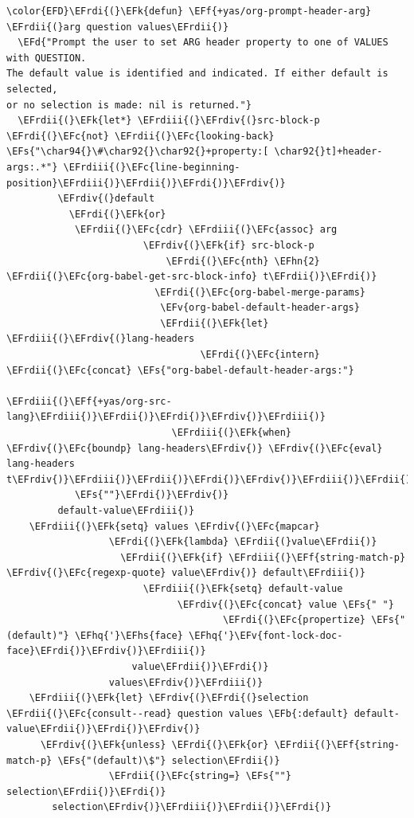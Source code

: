 \documentclass{scrartcl}
\newcommand{\EFk}[1]{\textcolor{EFk}{#1}} %
\newcommand{\EFd}[1]{\textcolor{EFd}{\textit{#1}}} %
\newcommand{\EFs}[1]{\textcolor{EFs}{#1}} %
\newcommand{\EFb}[1]{\textcolor{EFb}{#1}} %
\newcommand{\EFc}[1]{\textcolor{EFc}{#1}} %
\newcommand{\EFv}[1]{\textcolor{EFv}{#1}} %
\newcommand{\EFf}[1]{\textcolor{EFf}{#1}} %
\newcommand{\EFhn}[1]{\textcolor{EFhn}{\textbf{#1}}} %
\newcommand{\EFhq}[1]{\textcolor{EFhq}{#1}} %
\newcommand{\EFhs}[1]{\textcolor{EFhs}{#1}} %
\newcommand{\EFrdi}[1]{\textcolor{EFrdi}{#1}} %
\newcommand{\EFrdii}[1]{\textcolor{EFrdii}{#1}} %
\newcommand{\EFrdiii}[1]{\textcolor{EFrdiii}{#1}} %
\newcommand{\EFrdiv}[1]{\textcolor{EFrdiv}{#1}} %
\begin{document}
\begin{Code}
\begin{Verbatim}[]
\color{EFD}\EFrdi{(}\EFk{defun} \EFf{+yas/org-prompt-header-arg} \EFrdii{(}arg question values\EFrdii{)}
  \EFd{"Prompt the user to set ARG header property to one of VALUES with QUESTION.
The default value is identified and indicated. If either default is selected,
or no selection is made: nil is returned."}
  \EFrdii{(}\EFk{let*} \EFrdiii{(}\EFrdiv{(}src-block-p \EFrdi{(}\EFc{not} \EFrdii{(}\EFc{looking-back} \EFs{"\char94{}\#\char92{}\char92{}+property:[ \char92{}t]+header-args:.*"} \EFrdiii{(}\EFc{line-beginning-position}\EFrdiii{)}\EFrdii{)}\EFrdi{)}\EFrdiv{)}
         \EFrdiv{(}default
           \EFrdi{(}\EFk{or}
            \EFrdii{(}\EFc{cdr} \EFrdiii{(}\EFc{assoc} arg
                        \EFrdiv{(}\EFk{if} src-block-p
                            \EFrdi{(}\EFc{nth} \EFhn{2} \EFrdii{(}\EFc{org-babel-get-src-block-info} t\EFrdii{)}\EFrdi{)}
                          \EFrdi{(}\EFc{org-babel-merge-params}
                           \EFv{org-babel-default-header-args}
                           \EFrdii{(}\EFk{let} \EFrdiii{(}\EFrdiv{(}lang-headers
                                  \EFrdi{(}\EFc{intern} \EFrdii{(}\EFc{concat} \EFs{"org-babel-default-header-args:"}
                                                  \EFrdiii{(}\EFf{+yas/org-src-lang}\EFrdiii{)}\EFrdii{)}\EFrdi{)}\EFrdiv{)}\EFrdiii{)}
                             \EFrdiii{(}\EFk{when} \EFrdiv{(}\EFc{boundp} lang-headers\EFrdiv{)} \EFrdiv{(}\EFc{eval} lang-headers t\EFrdiv{)}\EFrdiii{)}\EFrdii{)}\EFrdi{)}\EFrdiv{)}\EFrdiii{)}\EFrdii{)}
            \EFs{""}\EFrdi{)}\EFrdiv{)}
         default-value\EFrdiii{)}
    \EFrdiii{(}\EFk{setq} values \EFrdiv{(}\EFc{mapcar}
                  \EFrdi{(}\EFk{lambda} \EFrdii{(}value\EFrdii{)}
                    \EFrdii{(}\EFk{if} \EFrdiii{(}\EFf{string-match-p} \EFrdiv{(}\EFc{regexp-quote} value\EFrdiv{)} default\EFrdiii{)}
                        \EFrdiii{(}\EFk{setq} default-value
                              \EFrdiv{(}\EFc{concat} value \EFs{" "}
                                      \EFrdi{(}\EFc{propertize} \EFs{"(default)"} \EFhq{'}\EFhs{face} \EFhq{'}\EFv{font-lock-doc-face}\EFrdi{)}\EFrdiv{)}\EFrdiii{)}
                      value\EFrdii{)}\EFrdi{)}
                  values\EFrdiv{)}\EFrdiii{)}
    \EFrdiii{(}\EFk{let} \EFrdiv{(}\EFrdi{(}selection \EFrdii{(}\EFc{consult--read} question values \EFb{:default} default-value\EFrdii{)}\EFrdi{)}\EFrdiv{)}
      \EFrdiv{(}\EFk{unless} \EFrdi{(}\EFk{or} \EFrdii{(}\EFf{string-match-p} \EFs{"(default)\$"} selection\EFrdii{)}
                  \EFrdii{(}\EFc{string=} \EFs{""} selection\EFrdii{)}\EFrdi{)}
        selection\EFrdiv{)}\EFrdiii{)}\EFrdii{)}\EFrdi{)}
\end{Verbatim}
\end{Code}
\end{document}
